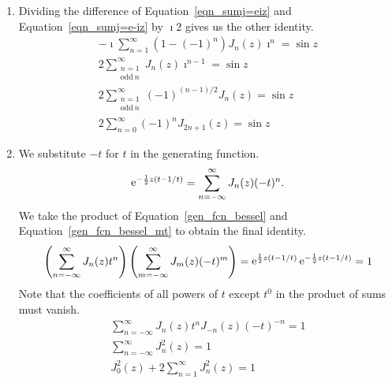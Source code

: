 {\begin{Solution}
\begin{enumerate}
    Equation~\ref{eqn_sumj=e-iz} by $2$ 
    gives us the desired identity.
    \begin{gather*}
      J_0(z) + \sum_{n = 1}^\infty \left( 1 + (-1)^n \right) J_n(z) \imath^n = \cos z 
      \\
      J_0(z) + 2 \sum_{\substack{n = 2 \\ \mathrm{even}\ n}}^\infty J_n(z) \imath^n = \cos z 
      \\
      J_0(z) + 2 \sum_{\substack{n = 2 \\ \mathrm{even}\ n}}^\infty (-1)^{n/2} J_n(z) = \cos z 
      \\
      \boxed{
        J_0(z) + 2 \sum_{n = 1}^\infty (-1)^n J_{2n}(z) = \cos z 
        }
    \end{gather*}
  \item
    Dividing the difference of Equation~\ref{eqn_sumj=eiz} and 
    Equation~\ref{eqn_sumj=e-iz} 
    by $\imath 2$ gives us the other identity.
    \begin{gather*}
      - \imath \sum_{n = 1}^\infty \left( 1 - (-1)^n \right) J_n(z) \imath^n = \sin z 
      \\
      2 \sum_{\substack{n = 1 \\ \mathrm{odd}\ n}}^\infty J_n(z) \imath^{n-1} = \sin z 
      \\
      2 \sum_{\substack{n = 1 \\ \mathrm{odd}\ n}}^\infty (-1)^{(n-1)/2} J_n(z) = \sin z 
      \\
      \boxed{
        2 \sum_{n = 0}^\infty (-1)^n J_{2n+1}(z) = \sin z 
        }
    \end{gather*}
  \item
    We substitute $-t$ for $t$ in the generating function.
    \begin{equation} 
      \label{gen_fcn_bessel_mt}
      \mathop{\mathrm{e}}\nolimits^{-\frac{1}{2} z (t - 1/t)} = \sum_{n = -\infty}^\infty J_n(z) (-t)^n.
    \end{equation}
    We take the product of Equation~\ref{gen_fcn_bessel} and 
    Equation~\ref{gen_fcn_bessel_mt}
    to obtain the final identity.
    \[
    \left( \sum_{n = -\infty}^\infty J_n(z) t^n \right) \left( \sum_{m = -\infty}^\infty J_m(z) (-t)^m \right)
    = \mathop{\mathrm{e}}\nolimits^{\frac{1}{2} z (t - 1/t)} \mathop{\mathrm{e}}\nolimits^{-\frac{1}{2} z (t - 1/t)} = 1
    \]
    Note that the coefficients of all powers of $t$ except $t^0$ in the product 
    of sums must vanish.
    \begin{gather*}
      \sum_{n = -\infty}^\infty J_n(z) t^n J_{-n}(z) (-t)^{-n} = 1 
      \\
      \sum_{n = -\infty}^\infty J_n^2(z) = 1 
      \\
      \boxed{
        J_0^2(z) + 2 \sum_{n = 1}^\infty J_n^2(z) = 1
        }
    \end{gather*}
  \end{enumerate}
\end{Solution}








}
